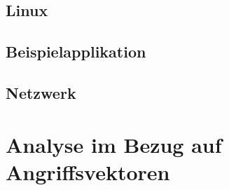\subsection{Linux}
\subsection{Beispielapplikation}
\subsection{Netzwerk}
\section{Analyse im Bezug auf Angriffsvektoren}